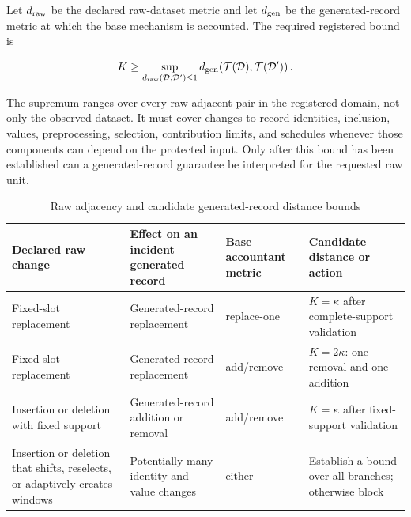Let \(d_{\mathrm{raw}}\) be the declared raw-dataset metric and let
\(d_{\mathrm{gen}}\) be the generated-record metric at which the base
mechanism is accounted.  The required registered bound is

\begin{equation}
    K
    \geq
    \sup_{d_{\mathrm{raw}}(\mathcal{D},\mathcal{D}')\leq1}
    d_{\mathrm{gen}}\!\left(
        \mathcal{T}(\mathcal{D}),
        \mathcal{T}(\mathcal{D}')
    \right).
    \label{eq:ch2-stability-bound}
\end{equation}

The supremum ranges over every raw-adjacent pair in the registered domain, not only
the observed dataset.  It must cover changes to record identities, inclusion,
values, preprocessing, selection, contribution limits, and schedules whenever
those components can depend on the protected input.  Only after this bound has
been established can a generated-record guarantee be interpreted for the requested
raw unit.

\begin{table}[tbp]
    \centering
    \caption{Raw adjacency and candidate generated-record distance bounds}
    \label{tab:ch2-adjacency-distance}
    \small
    \setlength{\tabcolsep}{3pt}
    \renewcommand{\arraystretch}{1.16}
    \begin{tabular}{@{}
        >{\raggedright\arraybackslash}p{}
        >{\raggedright\arraybackslash}p{}
        >{\raggedright\arraybackslash}p{}
        >{\raggedright\arraybackslash}p{}@{}}
        \toprule
        \textbf{Declared raw change} &
        \textbf{Effect on an incident generated record} &
        \textbf{Base accountant metric} &
        \textbf{Candidate distance or action} \\
        \midrule
        Fixed-slot replacement &
        Generated-record replacement &
        replace-one &
        \(K=\kappa\) after complete-support validation \\

        Fixed-slot replacement &
        Generated-record replacement &
        add/remove &
        \(K=2\kappa\): one removal and one addition \\

        Insertion or deletion with fixed support &
        Generated-record addition or removal &
        add/remove &
        \(K=\kappa\) after fixed-support validation \\

        Insertion or deletion that shifts, reselects, or adaptively creates windows &
        Potentially many identity and value changes &
        either &
        Establish a bound over all branches; otherwise block \\
        \bottomrule
    \end{tabular}
\end{table}


